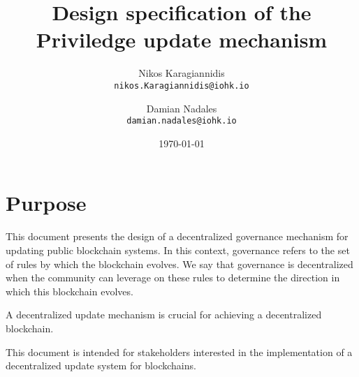 \documentclass[11pt,a4paper]{article}
\begin{document}

\title{
  Design specification of the Priviledge update mechanism\\
}

\author{
  Nikos Karagiannidis\\
  {\small \texttt{nikos.Karagiannidis@iohk.io}}\\
  \and
  Damian Nadales \\
  {\small \texttt{damian.nadales@iohk.io}}\\
}

\date{\today}

\maketitle

\begin{abstract}

\end{abstract}

\tableofcontents
\listoffigures
\listoftables

\section{Purpose}
\label{sec:purpose}

This document presents the design of a decentralized governance mechanism for
updating public blockchain systems.
In this context, governance refers to the set of rules by which the blockchain
evolves.
We say that governance is decentralized when the community can leverage on these
rules to determine the direction in which this blockchain evolves.


A decentralized update mechanism is crucial for achieving a decentralized
blockchain.

This document is intended for stakeholders interested in the implementation of a
decentralized update system for blockchains.
\end{document}
